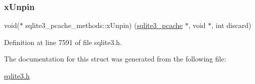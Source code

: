 \subsubsection{\texorpdfstring{x\+Unpin}{xUnpin}}
{\footnotesize\ttfamily void($\ast$ sqlite3\+\_\+pcache\+\_\+methods\+::x\+Unpin) (\mbox{\hyperlink{sqlite3_8h_a096c453d937d51f7926d7d31c8e0bd2f}{sqlite3\+\_\+pcache}} $\ast$, void $\ast$, int discard)}



Definition at line 7591 of file sqlite3.\+h.



The documentation for this struct was generated from the following file\+:\begin{DoxyCompactItemize}
\item 
\mbox{\hyperlink{sqlite3_8h}{sqlite3.\+h}}\end{DoxyCompactItemize}
